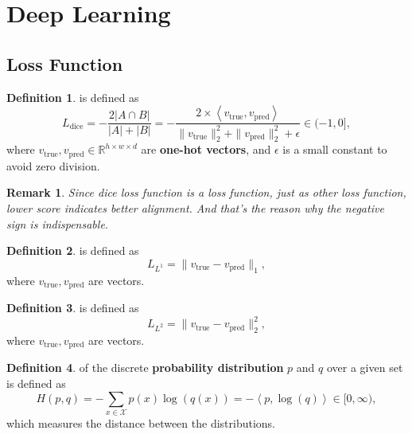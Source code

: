 \documentclass[a4paper]{article}
\theoremstyle{definition}
\newtheorem{definition}{Definition}
\theoremstyle{plain}
\newtheorem{remark}{Remark}
\begin{document}
\newpage
\section{Deep Learning}
\subsection{Loss Function}
\begin{definition}
 is defined as 
\begin{equation*}
    L_{\operatorname{dice}}=-\frac{2|A\cap B|}{|A|+|B|}=-\frac{2\times\left<v_{\operatorname{true}}, v_{\operatorname{pred}}\right>}{\|v_{\operatorname{true}}\|^2_2+\|v_{\operatorname{pred}}\|^2_2+\epsilon}\in(-1,0],
\end{equation*}
where $v_{\operatorname{true}},v_{\operatorname{pred}}\in\mathbb{R}^{h\times w\times d}$ are \textbf{one-hot vectors}, and $\epsilon$ is a small constant to avoid zero division. 
\end{definition}

\begin{remark}
Since dice loss function is a loss function, just as other loss function, lower score indicates better alignment. And that's the reason why the negative sign is indispensable.
\end{remark}

\begin{definition}
 is defined as 
\begin{equation*}
    L_{L^1}=\|v_{\operatorname{true}}-v_{\operatorname{pred}}\|_1,
\end{equation*}
where $v_{\operatorname{true}},v_{\operatorname{pred}}$ are vectors.
\end{definition}

\begin{definition}
 is defined as 
\begin{equation*}
    L_{L^2}=\|v_{\operatorname{true}}-v_{\operatorname{pred}}\|^2_2,
\end{equation*}
where $v_{\operatorname{true}},v_{\operatorname{pred}}$ are vectors.
\end{definition}

\begin{definition}
 of the discrete \textbf{probability distribution} $p$ and $q$ over a given set is defined as 
\begin{equation*}
    H(p,q)=-\sum_{x\in {\mathcal {X}}} p(x)\log(q(x))=-\left<p,\log(q)\right>\in[0,\infty),
\end{equation*}
which measures the distance between the distributions.
\end{definition}
\end{document}
